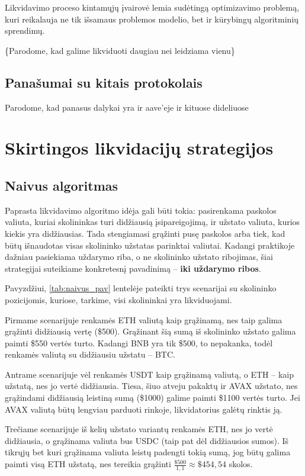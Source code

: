 \documentclass[]{VUMIFTemplateClass}
\begin{document}
Likvidavimo proceso kintamųjų įvairovė lemia sudėtingą optimizavimo problemą, kuri reikalauja ne tik išsamaus problemos modelio, bet ir kūrybingų algoritminių sprendimų.

\{Parodome, kad galime likviduoti daugiau nei leidziama vienu\}

\subsection{Panašumai su kitais protokolais}
Parodome, kad panasus dalykai yra ir aave'eje ir kituose dideliuose

\section{Skirtingos likvidacijų strategijos}

\subsection{Naivus algoritmas}

Paprasta likvidavimo algoritmo idėja gali būti tokia: pasirenkama paskolos valiuta, kuriai skolininkas turi didžiausią įsipareigojimą, ir užstato valiuta, kurios kiekis yra didžiausias. Tada stengiamasi grąžinti pusę paskolos arba tiek, kad būtų išnaudotas visas skolininko užstatas parinktai valiutai. Kadangi praktikoje dažniau pasiekiama uždarymo riba, o ne skolininko užstato ribojimas, šiai strategijai suteikiame konkretesnį pavadinimą – \textbf{iki uždarymo ribos}.

Pavyzdžiui, \ref{tab:naivus_pav} lentelėje pateikti trys scenarijai su skolininko pozicijomis, kuriose, tarkime, visi skolininkai yra likviduojami.

Pirmame scenarijuje renkamės ETH valiutą kaip grąžinamą, nes taip galima grąžinti didžiausią vertę (\$500). Grąžinant šią sumą iš skolininko užstato galima paimti \$550 vertės turto. Kadangi BNB yra tik \$500, to nepakanka, todėl renkamės valiutą su didžiausiu užstatu – BTC.

Antrame scenarijuje vėl renkamės USDT kaip grąžinamą valiutą, o ETH – kaip užstatą, nes jo vertė didžiausia. Tiesa, šiuo atveju pakaktų ir AVAX užstato, nes grąžindami didžiausią leistiną sumą (\$1000) galime paimti \$1100 vertės turto. Jei AVAX valiutą būtų lengviau parduoti rinkoje, likvidatorius galėtų rinktis ją.

Trečiame scenarijuje iš kelių užstato variantų renkamės ETH, nes jo vertė didžiausia, o grąžinama valiuta bus USDC (taip pat dėl didžiausios sumos). Iš tikrųjų bet kuri grąžinama valiuta leistų padengti tokią sumą, jog būtų galima paimti visą ETH užstatą, nes tereikia grąžinti $\frac{\$500}{1,1} \approx \$454,54$ skolos.
\end{document}

